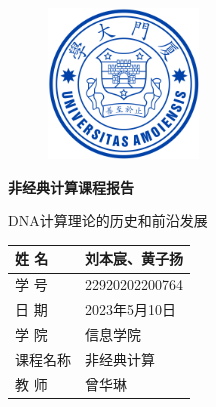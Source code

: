 \documentclass[a4paper,twoside]{article}
\title{\PaperTitle}
\author{\StudentName}
\date{\Date}
\newcommand{\StudentName}{刘本宸、黄子扬}  %
\newcommand{\PaperTitle}{DNA计算理论的历史和前沿发展}  %
\newcommand{\PaperType}{非经典计算课程报告} %
\newcommand{\Date}{2023年5月10日}
\newcommand{\College}{信息学院}
\newcommand{\CourseName}{非经典计算}
\begin{document}
\makeatletter %
\renewcommand*\maketitle{%
	\begin{center}
		\bfseries  %
		{\LARGE \@title \par}  %
		\vskip 1em  %
			{\global\let\author\@empty}  %
			{\global\let\date\@empty}  %
		\thispagestyle{empty}   %
	\end{center}%
	\setcounter{footnote}{0}%
}
\makeatother

\thispagestyle{empty}

\vspace*{1cm}

\begin{figure}[h]
	\centering
	\includegraphics[width=4.0cm]{logo.png}
\end{figure}

\vspace*{1cm}

\begin{center}
	\Huge{\textbf{\PaperType}}

	\Large{\PaperTitle}
\end{center}

\begin{table}[h]
	\centering
	\begin{Large}
		\renewcommand{\arraystretch}{1.5}
		\begin{tabular}{p{3cm} p{5cm}<{\centering}}
			姓 \quad 名 & \StudentName                         \\
			\hline
			学 \quad 号 & 22920202200764 \quad  22920202202789 \\
			\hline
			日 \quad 期 & \Date                                \\
			\hline
			学 \quad 院 & \College                             \\
			\hline
			课程名称    & \CourseName                          \\
			\hline
			教 \quad 师 & 曾华琳                               \\
		\end{tabular}
	\end{Large}
\end{table}
\end{document}
